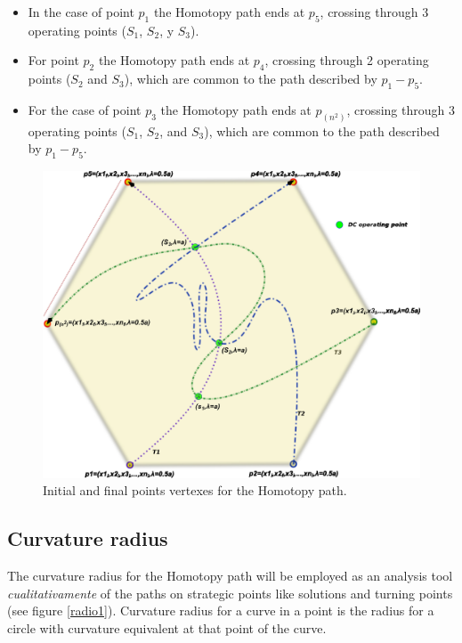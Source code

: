 \documentclass[conference,letterpaper,onecolumn]{IEEEtran}
\begin{document}
{\begin{itemize} 
\item In the case of point $p_1$ the Homotopy path ends at $p_5$, crossing through 3 operating points ($S_1$, $S_2$, y $S_3$).
\item For point $p_2$ the Homotopy path ends at $p_4$, crossing through 2 operating points ($S_2$ and $S_3$), which are common to the path described by $p_1-p_5$.
\item For the case of point $p_3$ the Homotopy path ends at $p_{(n^2)}$, crossing through 3 operating points ($S_1$, $S_2$, and $S_3$), which are common to the path described by $p_1-p_5$.
\end{itemize}

\begin{figure}[tbp]
\centering
\includegraphics[scale=0.65]{figs/poligono.eps}
\caption{Initial and final points vertexes for the Homotopy path.}
\label{poligono}
\end{figure}

\subsection{Curvature radius}

The curvature radius for the Homotopy path will be employed as an analysis tool {\it cualitativamente} of the paths on strategic points like solutions and turning points (see figure \ref{radio1}). Curvature radius for a curve in a point is the radius for a circle with curvature equivalent at that point of the curve.

}
\end{document}
